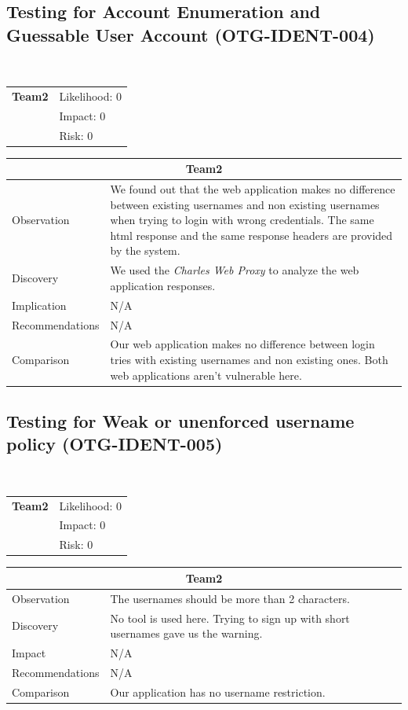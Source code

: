 \documentclass[headsepline,footsepline,footinclude=false,oneside,fontsize=11pt,paper=a4,listof=totoc,bibliography=totoc]{scrbook} %
\begin{document}
\subsection{Testing for Account Enumeration and Guessable User Account (OTG-IDENT-004)}\
\begin{tabular}{cR{12cm}}
	\textbf{Team2} & Likelihood: 0\\& Impact: 0\\& Risk: 0
\end{tabular}

\begin{tabular}{ l|p{11cm}  }
	\hline
	\multicolumn{2}{c}{\textbf{Team2}} \\
	\hline
	Observation   & We found out that the web application makes no difference between existing usernames and non existing usernames when trying to login with wrong credentials. The same html response and the same response headers are provided by the system. \\
	Discovery  & We used the \textit{Charles Web Proxy} to analyze the web application responses. \\
	Implication    & N/A \\
	Recommendations & N/A \\
	Comparison & Our web application makes no difference between login tries with existing usernames and non existing ones. Both web applications aren't vulnerable here. \\
	\hline
\end{tabular}
 
\pagebreak

\subsection{Testing for Weak or unenforced username policy (OTG-IDENT-005)}\
\begin{tabular}{cR{12cm}}
	\textbf{Team2} & Likelihood: 0\\& Impact: 0\\& Risk: 0
\end{tabular}

\begin{tabular}{ l|p{11cm}  }
	\hline
	\multicolumn{2}{c}{\textbf{Team2}} \\
	\hline
	Observation   & The usernames should be more than 2 characters. \\
	Discovery  & No tool is used here. Trying to sign up with short usernames gave us the warning. \\
	Impact   & N/A \\
	Recommendations & N/A \\
	Comparison & Our application has no username restriction. \\
	\hline
\end{tabular}
 
\end{document}

